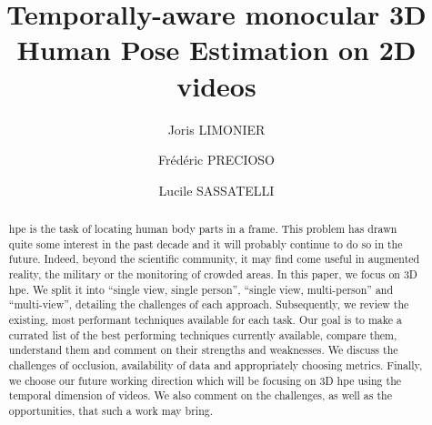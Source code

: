 \documentclass[runningheads]{llncs}
\begin{document}
\title{Temporally-aware monocular 3D Human Pose Estimation on 2D videos}

\author{
  Joris LIMONIER   \and
  Frédéric PRECIOSO   \and
  Lucile SASSATELLI  
}
%
%
%
\maketitle              %
%
\begin{abstract}
  \ac{hpe} is the task of locating human body parts in a frame. This problem has drawn quite some interest in the past decade and it will probably continue to do so in the future. Indeed, beyond the scientific community, it may find come useful in augmented reality, the military or the monitoring of crowded areas. In this paper, we focus on 3D \ac{hpe}. We split it into ``single view, single person'', ``single view, multi-person'' and ``multi-view'', detailing the challenges of each approach. Subsequently, we review the existing, most performant techniques available for each task. Our goal is to make a currated list of the best performing techniques currently available, compare them, understand them and comment on their strengths and weaknesses. We discuss the challenges of occlusion, availability of data and appropriately choosing metrics. Finally, we choose our future working direction which will be focusing on 3D \ac{hpe} using the temporal dimension of videos. We also comment on the challenges, as well as the opportunities, that such a work may bring.
\end{abstract}
\acresetall
\end{document}
